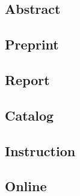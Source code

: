 \subsection{Abstract}
\subsection{Preprint}
\subsection{Report}
\subsection{Catalog}
\subsection{Instruction}
\subsection{Online}


